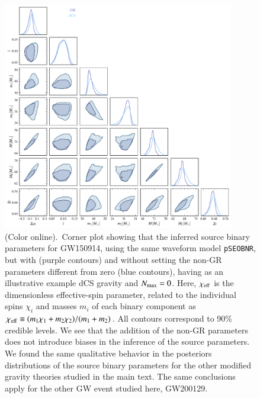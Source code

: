 \documentclass[twocolumn,
               prd,
               aps,
               superscriptaddress,
               tightenlines,
               nofootinbib,
               eqsecnum,
               amsfonts,
               amsmath,
               longbibliography]{revtex4-1}
\newcommand{\pSEOB}{\texttt{pSEOBNR}}
\begin{document}
\begin{figure}[t]
\includegraphics[width=0.9\textwidth]{figs/tmp_GW150914_intrinsic_params.pdf}
\caption{(Color online).~Corner plot showing that the inferred source binary parameters for GW150914,
using the same waveform model \pSEOB, but with (purple contours) and without setting the non-GR parameters different
from zero (blue contours), having as an illustrative example dCS gravity and $N_{\rm max}=0$.
%
Here, $\chi_{\rm eff}$ is the dimensionless effective-spin parameter, related to the individual spins $\chi_{i}$
and masses $m_{i}$ of each binary component as $\chi_{\rm eff} \equiv (m_1 \chi_1 + m_2 \chi_2) / (m_1 + m_2)$.
%
All contours correspond to 90\% credible levels.
%
We see that the addition of the non-GR parameters does not introduce biases in the
inference of the source parameters.
%
We found the same qualitative behavior in the posteriors distributions of the
source binary parameters for the other modified gravity theories studied in the
main text.
%
The same conclusions apply for the other GW event studied here, GW200129.
}
\label{fig:corner_plot_all}
\end{figure}



\end{document}

